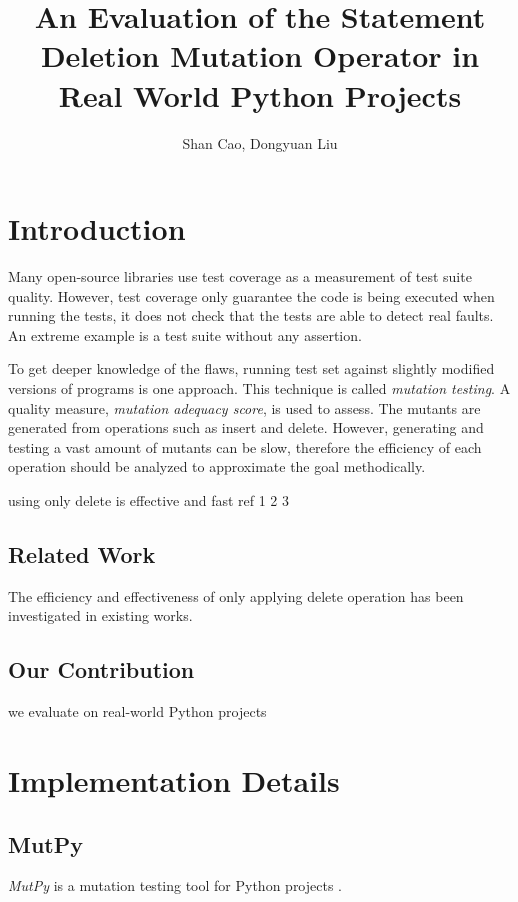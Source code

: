 \documentclass[12pt]{article}
\title{\textbf{An Evaluation of the Statement Deletion Mutation Operator in Real World Python Projects}}
\author{Shan Cao, Dongyuan Liu}
\begin{document}
\maketitle
\tableofcontents

\section{Introduction}

Many open-source libraries use test coverage as a measurement of test suite quality. However, test coverage only guarantee the code is being executed when running the tests, it does not check that the tests are able to detect real faults. An extreme example is a test suite without any assertion.

To get deeper knowledge of the flaws, running test set against slightly modified versions of programs is one approach\cite{}. This technique is called \emph{mutation testing}. A quality measure, \emph{mutation adequacy score}, is used to assess. The mutants are generated from operations such as insert and delete. However, generating and testing a vast amount of mutants can be slow, therefore the efficiency of each operation should be analyzed to approximate the goal methodically.

using only delete is effective and fast ref 1 2 3

\subsection{Related Work}

The efficiency and effectiveness of only applying delete operation has been investigated in existing works.

\subsection{Our Contribution}

we evaluate on real-world Python projects

\section{Implementation Details}

\subsection{MutPy}

\emph{MutPy} is a mutation testing tool for Python projects \cite{mutpy}.
\end{document}
